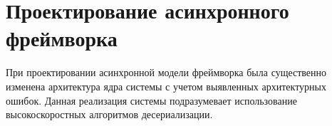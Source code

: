 \section{Проектирование асинхронного фреймворка}

При проектировании асинхронной модели фреймворка была существенно изменена архитектура ядра системы с учетом выявленных архитектурных ошибок. Данная реализация системы подразумевает использование высокоскоростных алгоритмов десериализации.
